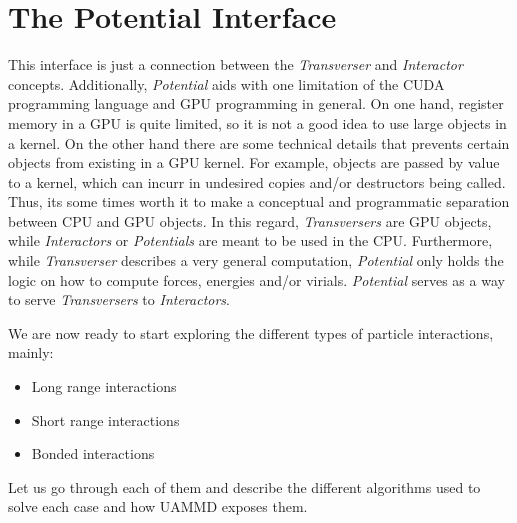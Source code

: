 \documentclass[ twoside,openright,titlepage,numbers=noenddot,%
headinclude,footinclude,cleardoublepage=empty,abstract=on,
BCOR=5mm,paper=a4,fontsize=11pt, dvipsnames
]{scrreprt}
\newcommand{\uammd}{\gls{UAMMD}\xspace}
\newcommand{\gpu}{\gls{GPU}\xspace}
\begin{document}
\section{The Potential Interface} \label{sec:potential}

This interface is just a connection between the \emph{Transverser} and \emph{Interactor} concepts. Additionally, \emph{Potential} aids with one limitation of the CUDA programming language and \gls{GPU} programming in general. On one hand, register memory in a \gpu is quite limited, so it is not a good idea to use large objects in a kernel. On the other hand there are some technical details that prevents certain objects from existing in a \gpu kernel. For example, objects are passed by value to a kernel, which can incurr in undesired copies and/or destructors being called. Thus, its some times worth it to make a conceptual and programmatic separation between CPU and \gpu objects.
In this regard, \emph{Transversers} are \gpu objects, while \emph{Interactors} or \emph{Potentials} are meant to be used in the CPU.
Furthermore, while \emph{Transverser} describes a very general computation, \emph{Potential} only holds the logic on how to compute forces, energies and/or virials.
\emph{Potential} serves as a way to serve \emph{Transversers} to \emph{Interactors}.






We are now ready to start exploring the different types of particle interactions, mainly:
\begin{itemize}
\item Long range interactions
\item Short range interactions
\item Bonded interactions
\end{itemize}

Let us go through each of them and describe the different algorithms used to solve each case and how \uammd exposes them.
\end{document}

